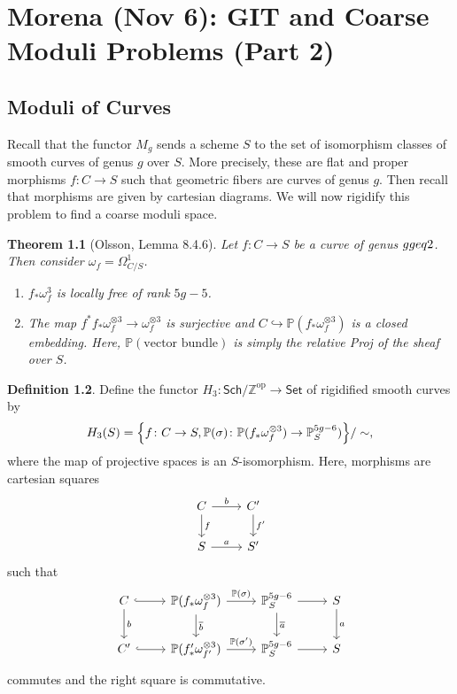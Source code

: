 \documentclass[leqno, openany]{memoir}
\newtheorem{thm}{Theorem}[section]
\theoremstyle{definition}
\newtheorem{defn}[thm]{Definition}
\theoremstyle{remark}
\theoremstyle{plain}
\theoremstyle{definition}
\theoremstyle{remark}
\newcommand{\Z}{\mathbb{Z}}
\renewcommand{\P}{\mathbb{P}}
\newcommand{\mr}[1]{\mathrm{#1}}
\newcommand{\ms}[1]{\mathsf{#1}}
\newcommand{\ol}[1]{\overline{#1}}
\begin{document}
\chapter{Morena (Nov 6): GIT and Coarse Moduli Problems (Part 2)}%
\label{cha:morena_nov_6_git_and_coarse_moduli_problems_part_2_}

\section{Moduli of Curves}%

Recall that the functor $M_g$ sends a scheme $S$ to the set of isomorphism
classes of smooth curves of genus $g$ over $S$. More precisely, these are flat
and proper morphisms $f \colon C \to S$ such that geometric fibers are curves
of genus $g$. Then recall that morphisms are given by cartesian diagrams. We
will now rigidify this problem to find a coarse moduli space. 

\begin{thm}[Olsson, Lemma 8.4.6] Let $f \colon C \to S$ be a curve of genus $g
    \\geq 2$. Then consider $\omega_f = \Omega^1_{C/S}$.  \begin{enumerate}
        \item $f_* \omega_f^3$ is locally free of rank $5g-5$.  \item The map
            $f^* f_* \omega_f^{\otimes 3} \to \omega_f^{\otimes 3}$ is
            surjective and $C \hookrightarrow \P(f_* \omega_f^{\otimes 3})$ is
            a closed embedding. Here, $\P(\text{vector bundle})$ is simply the
            relative Proj of the sheaf over $S$.  \end{enumerate} \end{thm}

\begin{defn} Define the functor $H_3 \colon \ms{Sch}/\Z^{\mr{op}} \to \ms{Set}$
    of rigidified smooth curves by \[ H_3(S) = \qty{ f \colon C \to S,
    \P(\sigma) \colon \P(f_* \omega_f^{\otimes 3}) \to \P_S^{5g-6} ) } / \sim,
\] where the map of projective spaces is an $S$-isomorphism. Here, morphisms
are cartesian squares \begin{equation*} \begin{tikzcd} C \arrow{r}{b}
    \arrow{d}{f} & C' \arrow{d}{f'} \\ S \arrow{r}{a} & S' \end{tikzcd}
    \end{equation*} such that \begin{equation} \label{eqn:largerect}
    \begin{tikzcd} C \arrow{d}{b} \arrow[hookrightarrow]{r} & \P(f_*
        \omega_f^{\otimes 3}) \arrow{r}{\P(\sigma)} \arrow{d}{\ol{b}} &
        \P_S^{5g-6} \arrow{r} \arrow{d}{\ol{a}} & S \arrow{d}{a} \\ C'
    \arrow[hookrightarrow]{r} & \P(f'_* \omega_{f'}^{\otimes 3})
\arrow{r}{\P(\sigma')} & \P_S^{5g-6} \arrow{r} & S \end{tikzcd} \end{equation}
commutes and the right square is commutative.  \end{defn}
\end{document}
